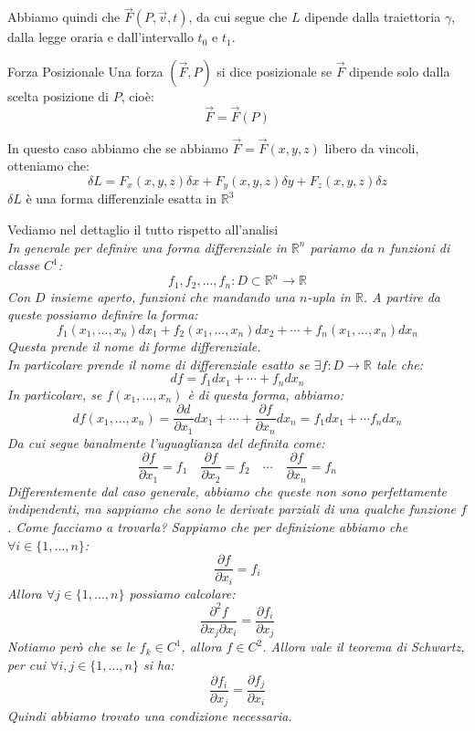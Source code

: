 \documentclass[11pt,a4paper,twoside]{article}
\theoremstyle{definition}
\begin{document}
Abbiamo quindi che $\vec F(P, \vec v, t)$, da cui segue che $L$ dipende dalla traiettoria $\gamma$, dalla legge oraria e dall'intervallo $t_0$ e $t_1$.

\begin{defn}{Forza Posizionale}{}
	Una forza $(\vec F, P)$ si dice posizionale se $\vec F$ dipende solo dalla scelta posizione di $P$, cioè:
	\[ \vec F = \vec F(P)\]
\end{defn}

In questo caso abbiamo che se abbiamo $\vec F = \vec F(x,y,z)$ libero da vincoli, otteniamo che:
\[ \delta L = F_x(x,y,z)\delta x + F_y(x,y,z) \delta y + F_z(x,y,z) \delta z \]
$\delta L$ è una forma differenziale esatta in $\mathbb R^3$

Vediamo nel dettaglio il tutto rispetto all'analisi\\
\textit{
	In generale per definire una forma differenziale in $\mathbb R^n$ pariamo da $n$ funzioni di classe $C^1$:
	\[ f_1,f_2,...,f_n : D \subset \mathbb R^n \to \mathbb R \]
	Con $D$ insieme aperto, funzioni che mandando una $n$-upla in $\mathbb R$. A partire da queste possiamo definire la forma:
	\[ f_1(x_1,...,x_n)dx_1 + f_2(x_1,...,x_n)dx_2 + \cdots + f_n(x_1,...,x_n)dx_n \]
	Questa prende il nome di forme differenziale.\\
	In particolare prende il nome di differenziale esatto se $\exists f:D \to \mathbb R$ tale che:
	\[ df = f_1dx_1 + \cdots + f_ndx_n \]
	In particolare, se $f(x_1,...,x_n)$ è di questa forma, abbiamo:
	\[ df(x_1,...,x_n) = \frac{\partial d}{\partial x_1}dx_1 + \cdots + \frac{\partial f}{\partial x_n}dx_n = f_1dx_1 + \cdots f_ndx_n \]
	Da cui segue banalmente l'uguaglianza del definita come:
	\[ \frac{\partial f}{\partial x_1} = f_1 \quad \frac{\partial f}{\partial x_2} = f_2 \quad \cdots \quad \frac{\partial f}{\partial x_n} = f_n \]
	Differentemente dal caso generale, abbiamo che queste non sono perfettamente indipendenti, ma sappiamo che sono le derivate parziali di una qualche funzione $f$. Come facciamo a trovarla?
	Sappiamo che per definizione abbiamo che $\forall i\in \{1,...,n\}$:
	\[\frac{\partial f}{\partial x_i} = f_i \]
	Allora $\forall j \in \{1,...,n\}$ possiamo calcolare:
	\[ \frac{\partial^2 f}{\partial x_j \partial x_i} = \frac{\partial f_i}{\partial x_j} \]
	Notiamo però che se le $f_k \in C^1$, allora $f \in C^2$. Allora vale il teorema di Schwartz, per cui $\forall i,j \in \{1,...,n\}$ si ha:
	\[\frac{\partial f_i}{\partial x_j} = \frac{\partial f_j}{\partial x_i}\]
	Quindi abbiamo trovato una condizione necessaria.\\
}
\end{document}
